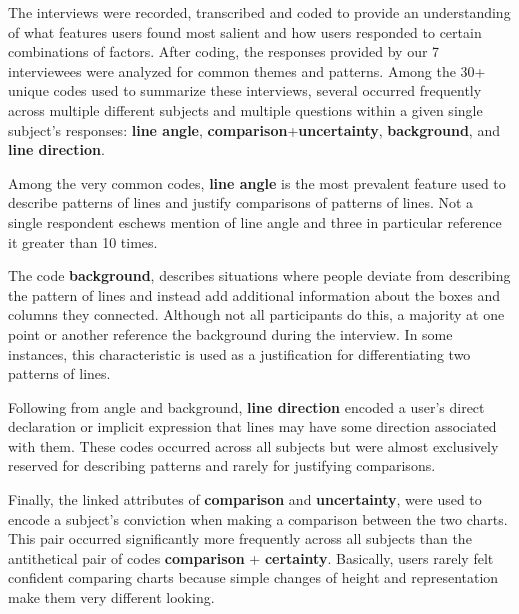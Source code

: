 The interviews were recorded, transcribed and coded to provide an understanding of what features users found most salient and how users responded to certain combinations of factors. After coding, the responses provided by our 7 interviewees were analyzed for common themes and patterns. Among the 30+ unique codes used to summarize these interviews, several occurred frequently across multiple different subjects and multiple questions within a given single subject's responses: \textbf{line angle}, \textbf{comparison}+\textbf{uncertainty}, \textbf{background}, and \textbf{line direction}. 


Among the very common codes, \textbf{line angle} is the most prevalent feature used to describe patterns of lines and justify comparisons of patterns of lines. Not a single respondent eschews mention of line angle and three in particular reference it greater than 10 times. 

The code \textbf{background}, describes situations where people deviate from describing the pattern of lines and instead add additional information about the boxes and columns they connected. Although not all participants do this, a majority at one point or another reference the background during the interview. In some instances, this characteristic is used as a justification for differentiating two patterns of lines. 

Following from angle and background, \textbf{line direction} encoded a user's direct declaration or implicit expression that lines may have some direction associated with them. These codes occurred across all subjects but were almost exclusively reserved for describing patterns and rarely for justifying comparisons. 

Finally, the linked attributes of \textbf{comparison} and \textbf{uncertainty}, were used to encode a subject's conviction when making a comparison between the two charts. This pair occurred significantly more frequently across all subjects than the antithetical pair of codes \textbf{comparison} + \textbf{certainty}. Basically, users rarely felt confident comparing charts because simple changes of height and representation make them very different looking. 


